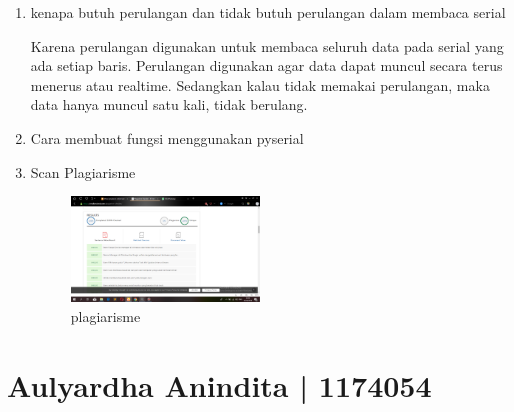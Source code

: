 \begin{enumerate}
\item kenapa butuh perulangan dan tidak butuh perulangan dalam membaca serial

Karena perulangan digunakan untuk membaca seluruh data pada serial yang ada setiap baris. Perulangan digunakan agar data dapat muncul secara terus menerus atau realtime. Sedangkan kalau tidak memakai perulangan, maka data hanya muncul satu kali, tidak berulang.

\item Cara membuat fungsi menggunakan pyserial



\item Scan Plagiarisme
\begin{figure}[ht!]
\includegraphics[width=5cm]{figures/5/1174069/plagiarisme.png}
\centering
\caption{plagiarisme}
\end{figure}
\end{enumerate}


\section{Aulyardha Anindita | 1174054}
